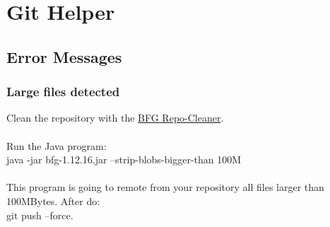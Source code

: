 
\chapter{Git Helper}


\section{Error Messages}

\subsection{Large files detected}

Clean the repository with the \href{https://rtyley.github.io/bfg-repo-cleaner}{BFG Repo-Cleaner}.\\
\\
Run the Java program:\\

java -jar bfg-1.12.16.jar --strip-blobs-bigger-than 100M\\
\\
This program is going to remote from your repository all files larger than 100MBytes. After do:\\

git push --force.